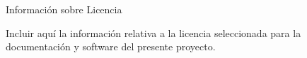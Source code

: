 


\chapter*{}

 \begin{center}

       Información sobre Licencia


\end{center}

Incluir aquí la información relativa a la licencia seleccionada para la documentación y software del presente proyecto.